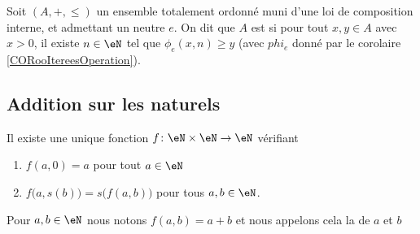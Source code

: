 \begin{definition}      \label{DEFooLCWLooYrToFv}
	Soit \( (A,+, \leq)\) un ensemble totalement ordonné muni d'une loi de composition interne, et admettant un neutre \( e \). On dit que \( A \) est  si pour tout \( x,y\in A\) avec \( x>0\), il existe \( n\in \eN\) tel que \( \phi_e(x,n) \geq y\) (avec \( phi_e \) donné par le corolaire \ref{CORooItereesOperation}).
\end{definition}


\subsection{Addition sur les naturels}

\begin{propositionDef}      \label{PROPooVFOXooXmwpFh}
	Il existe une unique fonction \( f\colon \eN\times \eN\to \eN\) vérifiant
	\begin{enumerate}
		\item       \label{ITEMooILZSooNYIkYR}
		      \( f(a,0)=a\) pour tout \( a\in \eN\)
		\item       \label{ITEMooZWHQooBAjZyE}
		      \( f\big( a,s(b) \big)=s\big( f(a,b) \big)\) pour tous \( a,b\in \eN\).
	\end{enumerate}
	Pour \( a,b\in \eN\) nous notons \( f(a,b)=a+b\) et nous appelons cela la  de \( a \) et \( b \)
\end{propositionDef}

